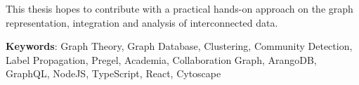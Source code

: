 This thesis hopes to contribute with a practical hands-on approach on the graph representation, integration and analysis of interconnected data.

\textbf{Keywords}: Graph Theory, Graph Database, Clustering, Community Detection, \gls{Label Propagation}, \gls{Pregel}, Academia, Collaboration Graph, ArangoDB, \gls{GraphQL}, \gls{NodeJS}, \gls{TypeScript}, \gls{React}, \gls{Cytoscape}